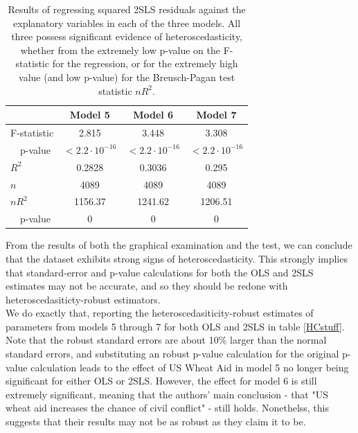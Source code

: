 \documentclass{article}
\begin{document}
\begin{table}
\center 
\begin{tabular}{| l | c | c | c|}
\hline
~ & Model 5 & Model 6 & Model 7 \\
\hline 

F-statistic & 2.815 & 3.448 & 3.308 \\
~~p-value & $ < 2.2\cdot10^{-16}$ & $< 2.2\cdot10^{-16}$ 
&$< 2.2\cdot10^{-16}$\\
$R^2$ &  0.2828 & 0.3036 &  0.295 \\
$n$ &  4089 & 4089 & 4089 \\
$nR^2$ & 1156.37 & 1241.62 & 1206.51 \\
~~p-value & 0 & 0 & 0\\
\hline
\end{tabular}
\label{Breusch2s}
\caption{Results of regressing squared 2SLS residuals against the explanatory variables in each of the three models. All three possess significant evidence of heteroscedasticity, whether from the extremely low p-value on the F-statistic for the regression, or for the extremely high value (and low p-value) for the Breusch-Pagan test statistic $nR^2$.}
\end{table}

From the results of both the graphical examination and the test, we can conclude that the dataset exhibits strong signs of heteroscedasticity. This strongly implies that standard-error and p-value calculations for both the OLS and 2SLS estimates may not be accurate, and so they should be redone with heteroscedasiticty-robust estimators.\\

We do exactly that, reporting the heteroscedasiticity-robust estimates of parameters from models 5 through 7 for both OLS and 2SLS in table \ref{HCstuff}. Note that the robust standard errors are about 10\% larger than the normal standard errors, and  substituting an robust p-value calculation for the original p-value calculation leads to the effect of US Wheat Aid in model 5 no longer being significant for either OLS or 2SLS. However, the effect for model 6 is still extremely significant, meaning that the authors' main conclusion - that "US wheat aid increases the chance of civil conflict" - still holds. Nonethelss, this suggests that their results may not be as robust as they claim it to be.  
\end{document}
